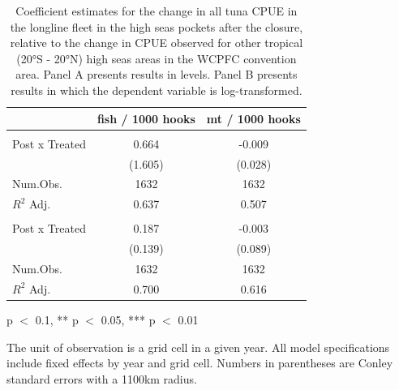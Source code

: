 \begin{table}
\centering
\begin{threeparttable}
\small
\caption{\label{tab:h2_reg_all}Coefficient estimates for the change in all
             tuna CPUE in the longline fleet in the high seas pockets after
             the closure, relative to the change in CPUE observed for other tropical
             (20°S - 20°N) high seas areas in the WCPFC convention area.
             Panel A presents results in levels. Panel B presents results in
             which the dependent variable is log-transformed.}
\centering
\begin{tabular}[t]{lcc}
\toprule
  & fish / 1000 hooks & mt / 1000 hooks\\
\midrule
\addlinespace[0.5em]
\multicolumn{3}{l}{\textit{A) Levels}}\\
\midrule \hspace{1em}Post x Treated & 0.664 & -0.009\\
\hspace{1em} & (1.605) & (0.028)\\
\hspace{1em}Num.Obs. & 1632 & \vphantom{1} 1632\\
\hspace{1em}$R^2$ Adj. & 0.637 & 0.507\\
\addlinespace[0.5em]
\multicolumn{3}{l}{\textit{B) Log-transformed}}\\
\midrule \hspace{1em}Post x Treated & 0.187 & -0.003\\
\hspace{1em} & (0.139) & (0.089)\\
\hspace{1em}Num.Obs. & 1632 & 1632\\
\hspace{1em}$R^2$ Adj. & 0.700 & 0.616\\
\bottomrule
\end{tabular}
\begin{tablenotes}
\small
\item * p $<$ 0.1, ** p $<$ 0.05, *** p $<$ 0.01
\item The unit of observation is a grid cell in a given year. All model specifications include fixed effects by year and grid cell. Numbers in parentheses are Conley standard errors with a 1100km radius.
\end{tablenotes}
\end{threeparttable}
\end{table}
